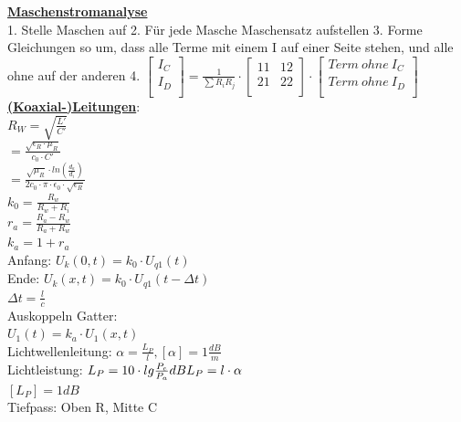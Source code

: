 \documentclass[11pt]{article}
\begin{document}
\begin{minipage}{0.3\textwidth}

\underline{\textbf{Maschenstromanalyse}}\\
1. Stelle Maschen auf
2. Für jede Masche Maschensatz aufstellen
3. Forme Gleichungen so um, dass alle Terme mit einem I auf einer Seite stehen, und alle ohne auf der anderen
4. $\begin{bmatrix}
	I_C\\
	I_D\\
\end{bmatrix} = \frac{1}{\sum R_iR_j} \cdot \begin{bmatrix}
	11 & 12\\ %
	21 & 22\\
\end{bmatrix} \cdot \begin{bmatrix}
	Term~ohne~I_C\\
	Term~ohne~I_D\\
\end{bmatrix} 
 $\\
 
 \underline{\textbf{(Koaxial-)Leitungen}}:\\
$R_W = \sqrt{\frac{L'}{C'}}$\\
    \phantom{sssi} $=\frac{\sqrt{\epsilon_R \cdot \mu_R}}{c_0 \cdot C'}$\\
    \phantom{sssi} $=\frac{\sqrt{\mu_R} \cdot ln(\frac{d_a}{d_i})}{2c_0 \cdot \pi \cdot \epsilon_0 \cdot \sqrt{\epsilon_R}}$\\


$k_0 = \frac{R_w}{R_w + R_i} $\\
$r_a = \frac{R_a - R_w}{R_a + R_w} $\\
$k_a = 1 + r_a$\\
Anfang: $U_k(0,t)=k_0 \cdot U_{q1}(t)$\\
Ende: $U_k(x,t)= k_0 \cdot U_{q1}(t-\Delta t)$\\
$\Delta t = \frac{l}{c}$\\
Auskoppeln Gatter:\\
\phantom{ss} $U_1(t) = k_a \cdot U_1(x,t)$\\
Lichtwellenleitung: $\alpha = \frac{L_P}{l}, [\alpha] = 1 \frac{dB}{m}$\\
Lichtleistung: $L_P = 10 \cdot lg\frac{P_e}{P_a} dB\\ L_P = l \cdot \alpha$\\
$ [L_P] = 1dB$\\
Tiefpass: Oben R, Mitte C





\end{minipage}%
\end{document}
